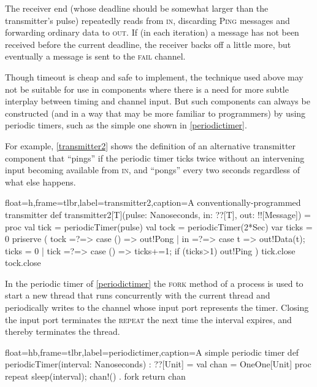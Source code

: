\documentclass[12pt]{IOS-Book-Article-CPA-2017}
\begin{document}
The receiver end (whose deadline should be somewhat larger 
than the transmitter's pulse) repeatedly reads from \textsc{in},
discarding \textsc{Ping} messages and forwarding ordinary
data to \textsc{out}. If (in each iteration) a message has not been
received before the current deadline, the receiver backs off a little more, 
but eventually a message is sent to the \textsc{fail} channel.


Though timeout is cheap and safe to implement, the
technique used above may not be suitable for use in components where
there is a need for more subtle interplay between timing and channel
input.
%
But such components can always be constructed (and in a way that
may be more familiar to \occam programmers) by using periodic timers,
such as the simple one shown in \Listing
\ref{periodictimer}.

For example, \Listing \ref{transmitter2} shows the definition of
an alternative transmitter component that ``pings'' if the periodic
timer ticks twice without an intervening input becoming available
from \textsc{in}, and ``pongs'' every two seconds regardless of
what else happens.

\begin{code+}[...]{float=h,frame=tlbr,label=transmitter2,caption={A conventionally-programmed transmitter}}
 def transmitter2[T](pulse: Nanoseconds, in: ??[T], out: !![Message]) = 
 proc 
 { val tick  = periodicTimer(pulse)
   val tock  = periodicTimer(2*Sec)
   var ticks = 0
   priserve ( tock =?=> { case () => out!Pong }
            | in   =?=> { case t  => out!Data(t); ticks = 0 }
            | tick =?=> { case () => ticks+=1; if (ticks>1) out!Ping }
            ) 
   tick.close
   tock.close
 } 
\end{code+}
In the periodic timer of \Listing \ref{periodictimer} the \textsc{fork} method of a process
is used to start a new thread that runs concurrently with the current thread and periodically writes
to the channel whose input port represents the timer. Closing the
input port terminates the \textsc{repeat} the next time the interval
expires, and thereby terminates the thread.
\begin{code+}[...]{float=hb,frame=tlbr,label=periodictimer,caption={A simple periodic timer}}
 def periodicTimer(interval: Nanoseconds) : ??[Unit] = 
 { val chan = OneOne[Unit]
   proc { repeat { sleep(interval); chan!() } } . fork
   return chan
 }
\end{code+}
\end{document}
